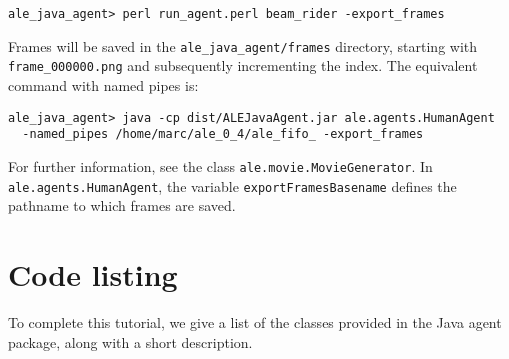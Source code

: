 \documentclass[12pt]{article}
\begin{document}
\begin{verbatim}
ale_java_agent> perl run_agent.perl beam_rider -export_frames
\end{verbatim}

Frames will be saved in the \verb+ale_java_agent/frames+ directory, starting
with \verb+frame_000000.png+ and subsequently incrementing the index. The
equivalent command with named pipes is:

\begin{verbatim}
ale_java_agent> java -cp dist/ALEJavaAgent.jar ale.agents.HumanAgent 
  -named_pipes /home/marc/ale_0_4/ale_fifo_ -export_frames
\end{verbatim}

For further information, see the class \verb+ale.movie.MovieGenerator+. In
\verb+ale.agents.HumanAgent+, the variable \verb+exportFramesBasename+ defines
the pathname to which frames are saved.

\section{Code listing}

To complete this tutorial, we give a list of the classes provided in the
Java agent package, along with a short description.
\end{document}
